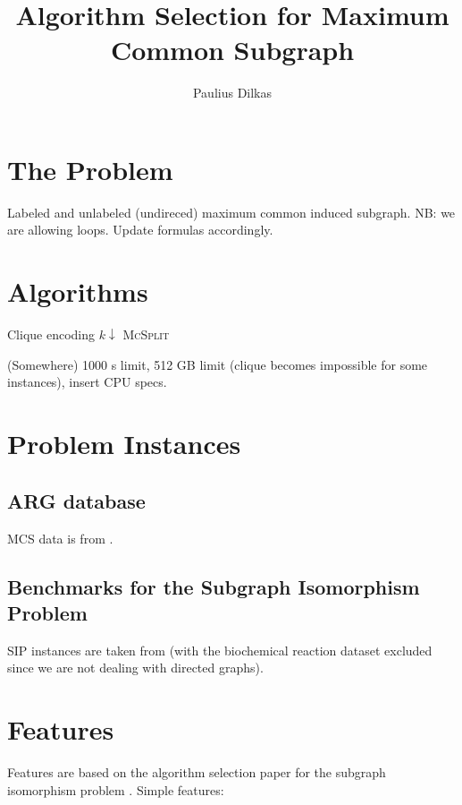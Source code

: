 \documentclass{article}
\author{Paulius Dilkas}
\title{Algorithm Selection for Maximum Common Subgraph}
\begin{document}
\maketitle

\section{The Problem}
Labeled and unlabeled (undireced) maximum common induced subgraph. NB: we are
allowing loops. Update formulas accordingly.

\section{Algorithms}
Clique encoding \cite{DBLP:conf/cp/McCreeshNPS16}
$k\downarrow$ \cite{DBLP:conf/aaai/HoffmannMR17}
\textsc{McSplit} \cite{DBLP:conf/ijcai/McCreeshPT17}

(Somewhere) 1000 s limit, 512 GB limit (clique becomes impossible for some
instances), insert CPU specs.

\section{Problem Instances}

\subsection{ARG database}
MCS data is from \cite{DeSanto2003}\cite{foggia2001-2}.

\subsection{Benchmarks for the Subgraph Isomorphism Problem}
SIP instances are taken from \cite{solnon} (with the biochemical reaction
dataset excluded since we are not dealing with directed graphs).

\section{Features}
Features are based on the algorithm selection paper for the subgraph isomorphism
problem \cite{DBLP:conf/lion/KotthoffMS16}. Simple features:
\end{document}
